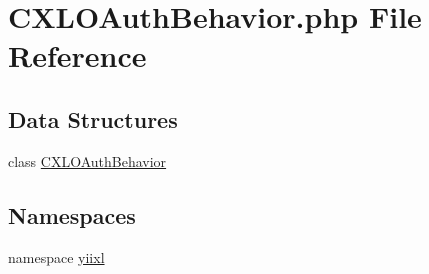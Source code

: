 \hypertarget{CXLOAuthBehavior_8php}{
\section{CXLOAuthBehavior.php File Reference}
\label{CXLOAuthBehavior_8php}
}
\subsection*{Data Structures}
\begin{DoxyCompactItemize}
\item 
class \hyperlink{classCXLOAuthBehavior}{CXLOAuthBehavior}
\end{DoxyCompactItemize}
\subsection*{Namespaces}
\begin{DoxyCompactItemize}
\item 
namespace \hyperlink{namespaceyiixl}{yiixl}
\end{DoxyCompactItemize}

